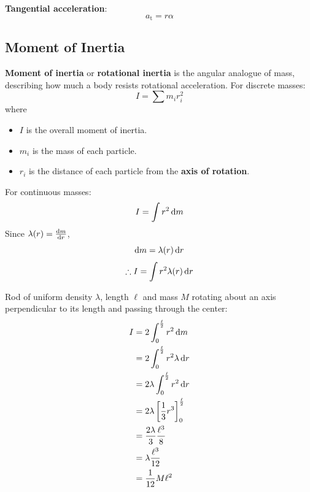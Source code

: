\documentclass[a4paper, titlepage]{book}
\begin{document}
\textbf{Tangential acceleration}:
\begin{equation}
    a_\mathrm{t} = r \alpha
\end{equation}

\subsection{Moment of Inertia}

\textbf{Moment of inertia} or \textbf{rotational inertia} is the angular analogue of mass,
describing how much a body resists rotational acceleration.
For discrete masses:
\begin{equation}
    I = \sum m_i r_i^2
\end{equation}
where
\begin{itemize}
    \item \(I\) is the overall moment of inertia.
    \item \(m_i\) is the mass of each particle.
    \item \(r_i\) is the distance of each particle from the \textbf{axis of rotation}.
\end{itemize}
For continuous masses:
\begin{equation}
    I = \int r^2 \odif{m}
\end{equation}
Since \(\lambda(r) = \odv{m}{r}\),
\begin{equation*}
    \odif{m} = \lambda(r) \odif{r}
\end{equation*}
\begin{equation}
    \therefore I = \int r^2 \lambda(r) \odif{r}
\end{equation}

Rod of uniform density \(\lambda\), length \(\ell\) and mass \(M\)
rotating about an axis perpendicular to its length and passing through the center:
\begin{align} \label{eq:uniform-rod-rotational-inertia}
    I &= 2 \int_{0}^{\frac{\ell}{2}} r^2 \odif{m} \\
    &= 2 \int_{0}^{\frac{\ell}{2}} r^2 \lambda \odif{r} \\
    &= 2 \lambda \int_{0}^{\frac{\ell}{2}} r^2 \odif{r} \\
    &= 2 \lambda \left[ \frac{1}{3} r^3 \right]^\frac{\ell}{2}_0 \\
    &= \frac{2 \lambda}{3} \frac{\ell^3}{8} \\
    &= \lambda \frac{\ell^3}{12} \\
    &= \frac{1}{12} M \ell^2
\end{align}
\end{document}
